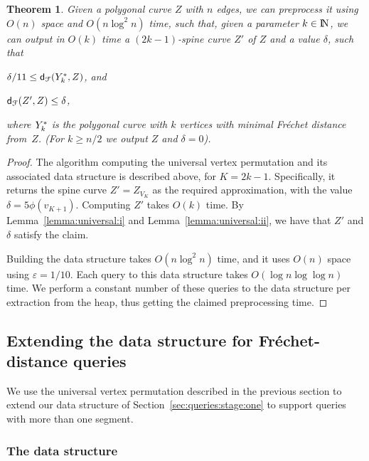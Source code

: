 \documentclass[12pt]{article}
\newtheorem{theorem}{Theorem}[section]
\newcommand{\seclab}[1]{\label{sec:#1}}
\newcommand{\secref}[1]{Section~\ref{sec:#1}}
\newcommand{\thmlab}[1]{{\label{theo:#1}}}
\newcommand{\lemref}[1]{Lemma~\ref{lemma:#1}}
\newcommand{\Frechet}{Fr\'{e}c{h}e{}t\xspace}\providecommand{\Arr}{\mathop{\mathrm{\EuScript{A}}}}
\newcommand{\distFr}[2]{\mathsf{d}_{\EuScript{F}}\pth{#1, #2}}
\newcommand{\SimplifyX}[1]{#1}
\newcommand{\cZ}{{Z}}
\newcommand{\cY}{\SimplifyX{\cYBase}}
\providecommand{\pth}[2][\!]{#1\left({#2}\right)}
\providecommand{\eps}{{\varepsilon}}\renewcommand{\Re}{{\rm I\!\hspace{-0.025em} R}}
\newcommand{\SpCrv}[2]{{#1}_{#2}}
\newcommand{\Na}{{\rm I\!\hspace{-0.025em} N}}
\newcommand{\vtxB}{v}
\newcommand{\constEps}{\ensuremath{1/10}}
\newcommand{\weight}[1]{\ensuremath{\phi\pth{\vtx_{#1}}}}
\newcommand{\vtx}{\vtxB}
\newcommand{\SNumVertices}[1]{2#1 - 1}
\newcommand{\cYk}{\cY_k^*}
\numberwithin{figure}{section}
\numberwithin{equation}{section}
\begin{document}
\begin{theorem}
    \thmlab{f:r:simpl:result}Given a polygonal curve $\cZ$ with $n$ edges, we can preprocess it
    using $O(n)$ space and $O\pth{ n\log^2 n }$ time, such that, given
    a parameter $k \in \Na$, we can output in $O(k)$ time a
    $(\SNumVertices{k})$-spine curve ${\cZ}'$ of $\cZ$ and a value
    $\delta$, such that \smallskip
    \begin{compactenum}[\quad(i)]
        \item $\delta/11 \leq \distFr{\cYk}{\cZ}$,
and \smallskip
        \item $\distFr{{\cZ}'}{\cZ} \leq \delta$,
    \end{compactenum}
    \smallskip where $\cYk$ is the polygonal curve with $k$ vertices with minimal
    \Frechet distance from~$\cZ$.  (For $k \geq n/2$ we output $\cZ$
    and $\delta=0$).
\end{theorem}

\begin{proof}
    The algorithm computing the universal vertex permutation and its
    associated data structure is described above, for $K
    =\SNumVertices{k}$.  Specifically, it returns the spine curve
    $\cZ' = \SpCrv{\cZ}{V_K}$ as the required approximation, with the
    value $\delta=5\weight{K+1}$. Computing $\cZ'$ takes $O(k)$ time.
    By \lemref{universal:i} and \lemref{universal:ii}, we have that
    $\cZ'$ and $\delta$ satisfy the claim.
    
    Building the data structure takes $O\pth{n \log^2 n }$ time, and
    it uses $O(n)$ space using $\eps=\constEps$. Each query to this
    data structure takes $O\pth{\log n \log\log n}$ time. We perform a
    constant number of these queries to the data structure per
    extraction from the heap, thus getting the claimed preprocessing
    time.
\end{proof}


\subsection{Extending the data structure for \Frechet-distance queries}
\seclab{k:seg:query}

We use the universal vertex permutation described in the previous
section to extend our data structure of \secref{queries:stage:one} to
support queries with more than one segment.

\subsubsection{The data structure}
\end{document}
